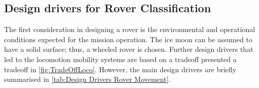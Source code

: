 \subsection{Design drivers for Rover Classification}
\label{sec:DesignDriversLoco}

The first consideration in designing a rover is the environmental and operational conditions expected for the mission operation. The ice moon can be assumed to have a solid surface; thus, a wheeled rover is chosen. Further design drivers that led to the locomotion mobility systems are based on a tradeoff presented a tradeoff in \autoref{fig:TradeOffLoco}. However, the main design drivers are briefly summarised in \autoref{tab:Design Drivers Rover Movement}.

\begin{table}[htb]
\centering
\caption{Design Drivers for the rover movement technique regarding the environmental conditions on Europa and operating conditions.}
\label{tab:Design Drivers Rover Movement}
\end{table}
